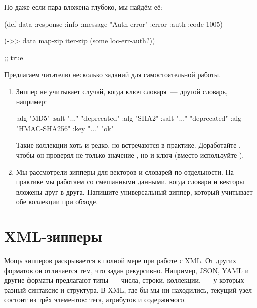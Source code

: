 Но даже если пара вложена глубоко, мы найдём её:

\begin{english}
  \begin{clojure}
(def data
  {:response {:info {:message "Auth error"
                     :error :auth
                     :code 1005}}})

(->> data
     map-zip
     iter-zip
     (some loc-err-auth?))

;; true
  \end{clojure}
\end{english}

Предлагаем читателю несколько заданий для самостоятельной работы.

\begin{enumerate}

\item
  Зиппер  не учитывает случай, когда ключ словаря~--- другой словарь,
  например:

\begin{english}
  \begin{clojure}
{{:alg "MD5" :salt "..."} "deprecated"
 {:alg "SHA2" :salt "..."} "deprecated"
 {:alg "HMAC-SHA256" :key "..."} "ok"}
  \end{clojure}
\end{english}

Такие коллекции хоть и редко, но встречаются в практике. Доработайте ,
чтобы он проверял не только значение , но и ключ (вместо 
используйте ).

\item
  Мы рассмотрели зипперы для векторов и словарей по отдельности. На практике мы
  работаем со смешанными данными, когда словари и векторы вложены друг в
  друга. Напишите универсальный зиппер, который учитывает обе коллекции при
  обходе.

\end{enumerate}

\section{XML-зипперы}

Мощь зипперов раскрывается в полной мере при работе с XML. От других форматов он
отличается тем, что задан рекурсивно. Например, JSON, YAML и другие форматы
предлагают типы~--- числа, строки, коллекции,~--- у которых разный синтаксис и
структура. В XML, где бы мы ни находились, текущий узел состоит из трёх
элементов: тега, атрибутов и содержимого.

